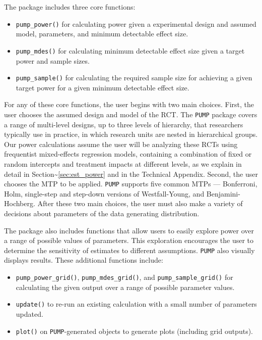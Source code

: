 \documentclass[
]{article}
\providecommand{\tightlist}{%
  \setlength{\itemsep}{0pt}\setlength{\parskip}{0pt}}
\begin{document}
The package includes three core functions:

\begin{itemize}
\tightlist
\item
  \texttt{pump\_power()} for calculating power given a experimental
  design and assumed model, parameters, and minimum detectable effect
  size.
\item
  \texttt{pump\_mdes()} for calculating minimum detectable effect size
  given a target power and sample sizes.
\item
  \texttt{pump\_sample()} for calculating the required sample size for
  achieving a given target power for a given minimum detectable effect
  size.
\end{itemize}

For any of these core functions, the user begins with two main choices.
First, the user chooses the assumed design and model of the RCT. The
\texttt{PUMP} package covers a range of multi-level designs, up to three
levels of hierarchy, that researchers typically use in practice, in
which research units are nested in hierarchical groups. Our power
calculations assume the user will be analyzing these RCTs using
frequentist mixed-effects regression models, containing a combination of
fixed or random intercepts and treatment impacts at different levels, as
we explain in detail in Section\textasciitilde{}\ref{sec:est_power} and
in the Technical Appendix. Second, the user chooses the MTP to be
applied. \texttt{PUMP} supports five common MTPs --- Bonferroni, Holm,
single-step and step-down versions of Westfall-Young, and
Benjamini-Hochberg. After these two main choices, the user must also
make a variety of decisions about parameters of the data generating
distribution.

The package also includes functions that allow users to easily explore
power over a range of possible values of parameters. This exploration
encourages the user to determine the sensitivity of estimates to
different assumptions. \texttt{PUMP} also visually displays results.
These additional functions include:

\begin{itemize}
\tightlist
\item
  \texttt{pump\_power\_grid()}, \texttt{pump\_mdes\_grid()}, and
  \texttt{pump\_sample\_grid()} for calculating the given output over a
  range of possible parameter values.
\item
  \texttt{update()} to re-run an existing calculation with a small
  number of parameters updated.
\item
  \texttt{plot()} on \texttt{PUMP}-generated objects to generate plots
  (including grid outputs).
\end{itemize}
\end{document}
